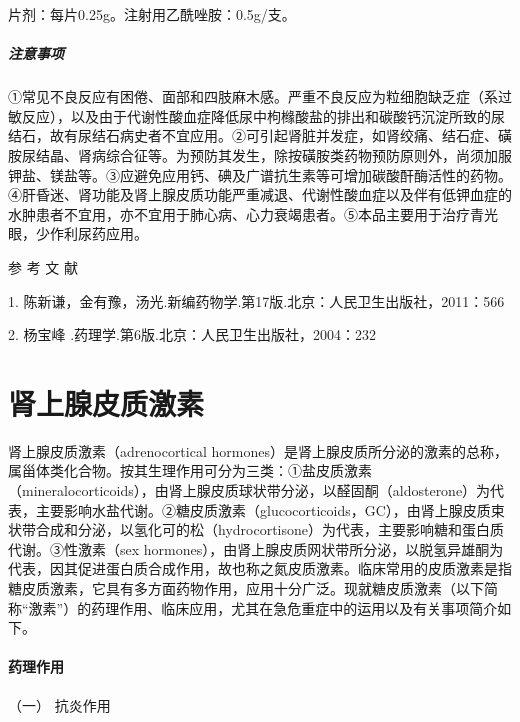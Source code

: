 片剂：每片0.25g。注射用乙酰唑胺：0.5g/支。

\paragraph{注意事项}

①常见不良反应有困倦、面部和四肢麻木感。严重不良反应为粒细胞缺乏症（系过敏反应），以及由于代谢性酸血症降低尿中枸橼酸盐的排出和碳酸钙沉淀所致的尿结石，故有尿结石病史者不宜应用。②可引起肾脏并发症，如肾绞痛、结石症、磺胺尿结晶、肾病综合征等。为预防其发生，除按磺胺类药物预防原则外，尚须加服钾盐、镁盐等。③应避免应用钙、碘及广谱抗生素等可增加碳酸酐酶活性的药物。④肝昏迷、肾功能及肾上腺皮质功能严重减退、代谢性酸血症以及伴有低钾血症的水肿患者不宜用，亦不宜用于肺心病、心力衰竭患者。⑤本品主要用于治疗青光眼，少作利尿药应用。

\protect\hypertarget{text00427.html}{}{}

\hypertarget{text00427.htmlux5cux23CHP17-5-9}{}
参 考 文 献

1.
陈新谦，金有豫，汤光.新编药物学.第17版.北京：人民卫生出版社，2011：566

2. 杨宝峰 .药理学.第6版.北京：人民卫生出版社，2004：232

\protect\hypertarget{text00428.html}{}{}

\chapter{肾上腺皮质激素}

肾上腺皮质激素（adrenocortical
hormones）是肾上腺皮质所分泌的激素的总称，属甾体类化合物。按其生理作用可分为三类：①盐皮质激素（mineralocorticoids），由肾上腺皮质球状带分泌，以醛固酮（aldosterone）为代表，主要影响水盐代谢。②糖皮质激素（glucocorticoids，GC），由肾上腺皮质束状带合成和分泌，以氢化可的松（hydrocortisone）为代表，主要影响糖和蛋白质代谢。③性激素（sex
hormones），由肾上腺皮质网状带所分泌，以脱氢异雄酮为代表，因其促进蛋白质合成作用，故也称之氮皮质激素。临床常用的皮质激素是指糖皮质激素，它具有多方面药物作用，应用十分广泛。现就糖皮质激素（以下简称“激素”）的药理作用、临床应用，尤其在急危重症中的运用以及有关事项简介如下。

\subsubsection{药理作用}

\hypertarget{text00428.htmlux5cux23CHP17-6-1-1}{}
（一） 抗炎作用

